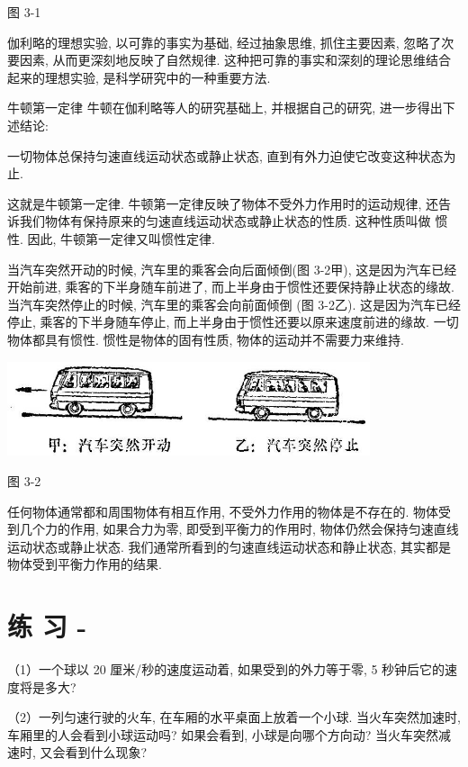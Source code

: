 \documentclass[10pt]{article}
\begin{document}
图 3-1

伽利略的理想实验, 以可靠的事实为基础, 经过抽象思维, 抓住主要因素, 忽略了次要因素, 从而更深刻地反映了自然规律. 这种把可靠的事实和深刻的理论思维结合起来的理想实验, 是科学研究中的一种重要方法.

牛顿第一定律 牛顿在伽利略等人的研究基础上, 并根据自己的研究, 进一步得出下述结论:

一切物体总保持匀速直线运动状态或静止状态, 直到有外力迫使它改变这种状态为止.

这就是牛顿第一定律. 牛顿第一定律反映了物体不受外力作用时的运动规律, 还告诉我们物体有保持原来的匀速直线运动状态或静止状态的性质. 这种性质叫做 惯性. 因此, 牛顿第一定律又叫惯性定律.

当汽车突然开动的时候, 汽车里的乘客会向后面倾倒(图 3-2甲), 这是因为汽车已经开始前进, 乘客的下半身随车前进了, 而上半身由于惯性还要保持静止状态的缘故. 当汽车突然停止的时候, 汽车里的乘客会向前面倾倒 (图 3-2乙). 这是因为汽车已经停止, 乘客的下半身随车停止, 而上半身由于惯性还要以原来速度前进的缘故. 一切物体都具有惯性. 惯性是物体的固有性质, 物体的运动并不需要力来维持.

\begin{center}
\includegraphics[max width=0.8\textwidth]{images/01912d55-147c-70aa-b0e0-1782a122f948_93_914019.jpg}
\end{center}

图 3-2

任何物体通常都和周围物体有相互作用, 不受外力作用的物体是不存在的. 物体受到几个力的作用, 如果合力为零, 即受到平衡力的作用时, 物体仍然会保持匀速直线运动状态或静止状态. 我们通常所看到的匀速直线运动状态和静止状态, 其实都是物体受到平衡力作用的结果.

\section*{练 习 -}

（1）一个球以 20 厘米/秒的速度运动着, 如果受到的外力等于零, 5 秒钟后它的速度将是多大?

（2）一列匀速行驶的火车, 在车厢的水平桌面上放着一个小球. 当火车突然加速时, 车厢里的人会看到小球运动吗? 如果会看到, 小球是向哪个方向动? 当火车突然减速时, 又会看到什么现象?
\end{document}
